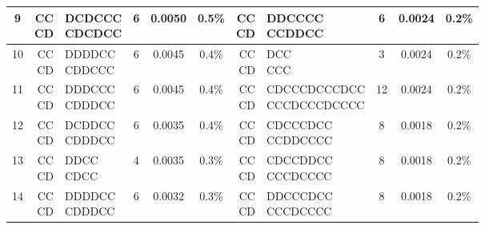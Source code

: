 \documentclass[9pt,twoside,lineno]{pnas-new}
\theoremstyle{plainCl1}
\theoremstyle{plainCl2}
\begin{document}
\begin{table}[t]
{\begin{tabular}{c|rlccc|rlccc}
    9  &  \cellcolor{gray!25} \makecell[r]{CC \\ CD} & \makecell[l]{ DCDCCC \\   CDCDCC} &  6 &  0.0050 & 0.5\%  &   \cellcolor{gray!25} \makecell[r]{CC \\ CD} & \makecell[l]{       DDCCCC \\        CCDDCC} &   6 &   0.0024 & 0.2\% \\ \hline
    10 &  \cellcolor{gray!25} \makecell[r]{CC \\ CD} & \makecell[l]{ DDDDCC \\   CDDCCC} &  6 &  0.0045 & 0.4\%  &   \cellcolor{gray!25} \makecell[r]{CC \\ CD} & \makecell[l]{          DCC \\           CCC} &   3 &   0.0024 & 0.2\% \\ \hline
    11 &  \cellcolor{gray!25} \makecell[r]{CC \\ CD} & \makecell[l]{ DDDCCC \\   CDDDCC} &  6 &  0.0045 & 0.4\%  &   \cellcolor{gray!25} \makecell[r]{CC \\ CD} & \makecell[l]{ CDCCCDCCCDCC \\  CCCDCCCDCCCC} &  12 &   0.0024 & 0.2\% \\ \hline
    12 &  \cellcolor{gray!25} \makecell[r]{CC \\ CD} & \makecell[l]{ DCDDCC \\   CDDDCC} &  6 &  0.0035 & 0.4\%  &   \cellcolor{gray!25} \makecell[r]{CC \\ CD} & \makecell[l]{     CDCCCDCC \\      CCDDCCCC} &   8 &   0.0018 & 0.2\% \\ \hline
    13 &  \cellcolor{gray!25} \makecell[r]{CC \\ CD} & \makecell[l]{   DDCC \\     CDCC} &  4 &  0.0035 & 0.3\%  &   \cellcolor{gray!25} \makecell[r]{CC \\ CD} & \makecell[l]{     CDCCDDCC \\      CCCDCCCC} &   8 &   0.0018 & 0.2\% \\ \hline
    14 &  \cellcolor{gray!25} \makecell[r]{CC \\ CD} & \makecell[l]{ DDDDCC \\   CDDDCC} &  6 &  0.0032 & 0.3\%  &   \cellcolor{gray!25} \makecell[r]{CC \\ CD} & \makecell[l]{     DDCCCDCC \\      CCCDCCCC} &   8 &   0.0018 & 0.2\% \\ \hline

\end{tabular}}
\end{table}
\end{document}
